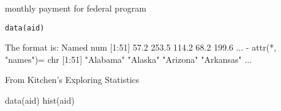 \begin{Description}\relax
monthly payment for federal program
\end{Description}
\begin{Usage}
\begin{verbatim}data(aid)\end{verbatim}
\end{Usage}
\begin{Format}\relax
The format is:
Named num [1:51]  57.2 253.5 114.2  68.2 199.6 ...
- attr(*, "names")= chr [1:51] "Alabama" "Alaska" "Arizona" "Arkansas" ...
\end{Format}
\begin{Source}\relax
From Kitchen's Exploring Statistics
\end{Source}
\begin{Examples}
\begin{ExampleCode}
data(aid)
hist(aid)
\end{ExampleCode}
\end{Examples}

